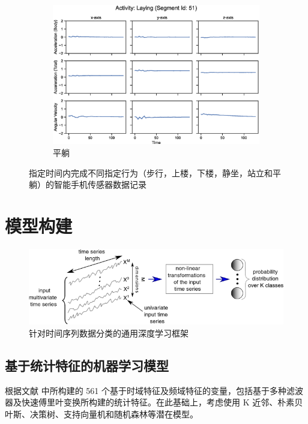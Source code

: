 \documentclass[screen,17pt,cn,founder,mtpro2]{elegantnote}
\begin{document}
\begin{figure}
\begin{subfigure}{.33\textwidth}
        \includegraphics[width=\linewidth]{images/activity-laying-segment-51.eps}
        \caption{平躺}
    \end{subfigure}
    \caption{指定时间内完成不同指定行为（步行，上楼，下楼，静坐，站立和平躺）的智能手机传感器数据记录}
\end{figure}
\clearpage

\section{模型构建}

\begin{figure}[hpt]
    \centering
    \includegraphics[width=.9\linewidth]{images/general-deep-learning-for-time-series-classification.png}
    \caption{针对时间序列数据分类的通用深度学习框架\citep{ismail_fawaz_deep_2019}}
\end{figure}

\subsection{基于统计特征的机器学习模型}


根据文献 \cite{anguita_human_2012} 中所构建的 561 个基于时域特征及频域特征的变量，包括基于多种滤波器及快速傅里叶变换所构建的统计特征。在此基础上，考虑使用 K 近邻、朴素贝叶斯、决策树、支持向量机和随机森林等潜在模型。
\clearpage
\end{document}
